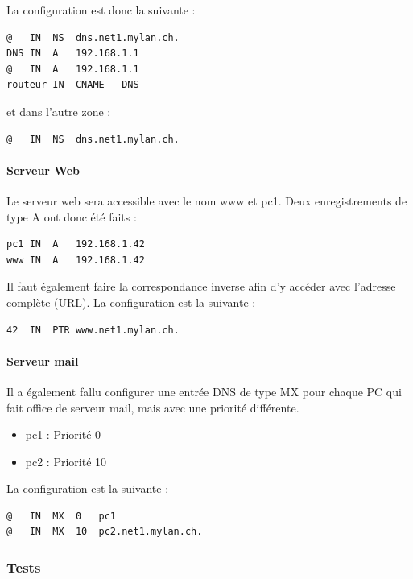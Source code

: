 \documentclass{article}
\begin{document}
La configuration est donc la suivante : 

\begin{lstlisting}
@	IN	NS	dns.net1.mylan.ch.
DNS	IN	A	192.168.1.1
@	IN	A	192.168.1.1
routeur	IN	CNAME	DNS
\end{lstlisting}

et dans l'autre zone :

\begin{lstlisting}
@	IN 	NS	dns.net1.mylan.ch.
\end{lstlisting}

\paragraph{Serveur Web}

Le serveur web sera accessible avec le nom www et pc1. Deux enregistrements de type A ont donc été faits : \\

\begin{lstlisting}
pc1	IN	A	192.168.1.42
www	IN	A	192.168.1.42
\end{lstlisting}

Il faut également faire la correspondance inverse afin d'y accéder avec l'adresse complète (URL). La configuration est la suivante : 

\begin{lstlisting}
42	IN	PTR	www.net1.mylan.ch.
\end{lstlisting}

\paragraph{Serveur mail}

Il a également fallu configurer une entrée DNS de type MX pour chaque PC qui fait office de serveur mail, mais avec une priorité différente.

\begin{itemize}
	\item pc1 : Priorité 0
	\item pc2 : Priorité 10
\end{itemize}

La configuration est la suivante : 

\begin{lstlisting}
@	IN	MX	0	pc1
@	IN	MX	10	pc2.net1.mylan.ch.
\end{lstlisting}

\clearpage

\subsubsection{Tests}
\end{document}
